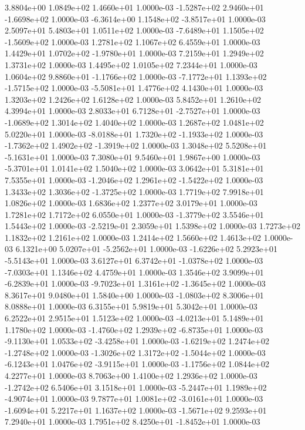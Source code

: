 3.8804e+00 1.0849e+02 1.4660e+01  1.0000e-03
-1.5287e+02  2.9460e+01 -1.6698e+02  1.0000e-03
-6.3614e+00  1.1548e+02 -3.8517e+01  1.0000e-03
2.5097e+01 5.4803e+01 1.0511e+02  1.0000e-03
-7.6489e+01  1.1505e+02 -1.5609e+02  1.0000e-03
1.2781e+02 1.1067e+02 6.4559e+01  1.0000e-03
 1.4429e+01  1.0702e+02 -1.9780e+01  1.0000e-03
7.2159e+01 1.2949e+02 1.3731e+02  1.0000e-03
1.4495e+02 1.0105e+02 7.2344e+01  1.0000e-03
 1.0604e+02  9.8860e+01 -1.1766e+02  1.0000e-03
-7.1772e+01  1.1393e+02 -1.5715e+02  1.0000e-03
-5.5081e+01  1.4776e+02  4.1430e+01  1.0000e-03
1.3203e+02 1.2426e+02 1.6128e+02  1.0000e-03
5.8452e+01 1.2610e+02 4.3994e+01  1.0000e-03
 2.8033e+01  6.7128e+01 -2.7527e+01  1.0000e-03
-1.0689e+02  1.3014e+02  1.4040e+02  1.0000e-03
1.2687e+02 1.0481e+02 5.0220e+01  1.0000e-03
-8.0188e+01  1.7320e+02 -1.1933e+02  1.0000e-03
-1.7362e+02  1.4902e+02 -1.3919e+02  1.0000e-03
 1.3048e+02  5.5208e+01 -5.1631e+01  1.0000e-03
7.3080e+01 9.5460e+01 1.9867e+00  1.0000e-03
-5.3701e+01  1.0141e+02  1.5040e+02  1.0000e-03
3.0642e+01 5.3181e+01 7.5355e+01  1.0000e-03
-1.2046e+02  1.2961e+02 -1.5422e+02  1.0000e-03
 1.3433e+02  1.3036e+02 -1.3725e+02  1.0000e-03
1.7719e+02 7.9918e+01 1.0826e+02  1.0000e-03
1.6836e+02 1.2377e+02 3.0179e+01  1.0000e-03
1.7281e+02 1.7172e+02 6.0550e+01  1.0000e-03
-1.3779e+02  3.5546e+01  1.5443e+02  1.0000e-03
-2.5219e-01  2.3059e+01  1.5398e+02  1.0000e-03
1.7273e+02 1.1832e+02 1.2161e+02  1.0000e-03
1.2414e+02 1.5660e+02 1.4613e+02  1.0000e-03
 6.1321e+00  5.0207e+01 -5.2562e+01  1.0000e-03
-1.6226e+02  5.2923e+01 -5.5143e+01  1.0000e-03
 3.6127e+01  6.3742e+01 -1.0378e+02  1.0000e-03
-7.0303e+01  1.1346e+02  4.4759e+01  1.0000e-03
 1.3546e+02  3.9099e+01 -6.2839e+01  1.0000e-03
-9.7023e+01  1.3161e+02 -1.3645e+02  1.0000e-03
8.3617e+01 9.0480e+01 1.5840e+00  1.0000e-03
-1.0803e+02  8.3006e+01  8.0888e+01  1.0000e-03
6.3155e+01 5.9819e+01 5.3042e+01  1.0000e-03
6.2522e+01 2.9515e+01 1.5123e+02  1.0000e-03
-4.0213e+01  5.1489e+01  1.1780e+02  1.0000e-03
-1.4760e+02  1.2939e+02 -6.8735e+01  1.0000e-03
-9.1130e+01  1.0533e+02 -3.4258e+01  1.0000e-03
-1.6219e+02  1.2474e+02 -1.2748e+02  1.0000e-03
-1.3026e+02  1.3172e+02 -1.5044e+02  1.0000e-03
-6.1243e+01  1.0476e+02 -3.9115e+01  1.0000e-03
-1.1756e+02  1.0844e+02  4.2277e+01  1.0000e-03
8.7063e+00 1.4100e+02 1.2936e+02  1.0000e-03
-1.2742e+02  6.5406e+01  3.1518e+01  1.0000e-03
-5.2447e+01  1.1989e+02 -4.9074e+01  1.0000e-03
 9.7877e+01  1.0081e+02 -3.0161e+01  1.0000e-03
-1.6094e+01  5.2217e+01  1.1637e+02  1.0000e-03
-1.5671e+02  9.2593e+01  7.2940e+01  1.0000e-03
 1.7951e+02  8.4250e+01 -1.8452e+01  1.0000e-03
